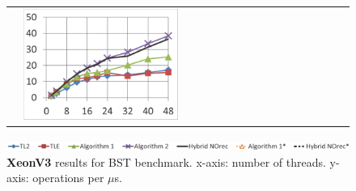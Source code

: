 \begin{figure}
\begin{minipage}{1\linewidth}
\begin{tabular}{m{0.03\linewidth}m{0.485\linewidth}m{0.485\linewidth}}
        \vspace{-8mm}\includegraphics[width=\linewidth]{figures/graphs/20i20d100000k-nrq0.png} &
        \vspace{-8mm}\includegraphics[width=\linewidth]{figures/graphs/20i20d100000k-nrq1.png}
        \\
    \end{tabular}
\end{minipage}
    \vspace{-2mm}
	\includegraphics[width=\linewidth]{figures/graphs/power8/dsbench3_legend_power.png}
    \vspace{-2mm}
\caption{\textbf{XeonV3} results for BST benchmark. x-axis: number of threads. y-axis: operations per $\mu$s.}
\label{fig-exp-xeonv3}
\end{figure}


